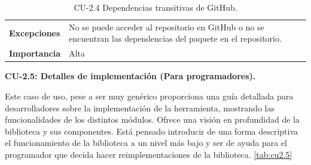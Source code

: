 \begin{table}[p]
\begin{tabularx}{\linewidth}{ p{} p{} }
		\textbf{Excepciones}          & No se puede acceder al repositorio en GitHub o no se encuentran las dependencias del paquete en el repositorio.                                                            \\
		\textbf{Importancia}          & Alta                                                                                                                                                                       \\
		\bottomrule
	\end{tabularx}
	\caption{CU-2.4 Dependencias transitivas de GitHub.}
	\label{tab:cu2.4}
\end{table}


\textbf{CU-2.5: Detalles de implementación (Para programadores).}

Este caso de uso, pese a ser muy genérico proporciona una guía detallada para desarrolladores sobre la implementación
de la herramienta, mostrando las funcionalidades de los distintos módulos. Ofrece una visión en
profundidad de la biblioteca y sus componentes. Está pensado introducir de una forma descriptiva el funcionamiento de la biblioteca
a un nivel más bajo y ser de ayuda para el programador que decida hacer reimplementaciones de la biblioteca. \ref{tab:cu2.5}

